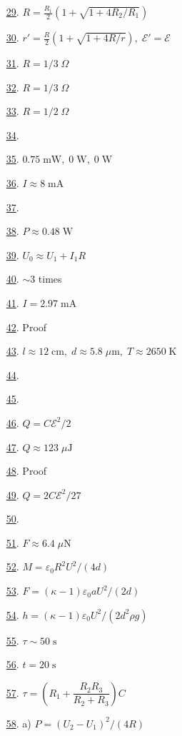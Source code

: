 \documentclass[11pt]{article}
\begin{document}
\begin{multicols}{2}
\begin{enumerate}
	\item [\hyperlink{P29}{29}.] $R=\frac{R_1}{2}\left(1+\sqrt{1+4R_2/R_1}\right)$ %
	\item [\hyperlink{P30}{30}.] $r'=\frac{R}{2}\left(1+\sqrt{1+4R/r}\right),\;\mathcal{E}'=\mathcal{E}$ %
	\item [\hyperlink{P31}{31}.] $R=1/3\;\Omega$ %
	\item [\hyperlink{P32}{32}.] $R=1/3\;\Omega$ %
	\item [\hyperlink{P33}{33}.] $R=1/2\;\Omega$ %
	\item [\hyperlink{P34}{34}.]  %
	\item [\hyperlink{P35}{35}.] $0.75\;\text{mW},\;0\;\text{W},\;0\;\text{W}$ %
	\item [\hyperlink{P36}{36}.] $I\approx8\;\text{mA}$ %
	\item [\hyperlink{P37}{37}.]  %
	\item [\hyperlink{P38}{38}.] $P\approx0.48\;\text{W}$ %
	\item [\hyperlink{P39}{39}.] $U_0\approx U_1+I_1R$ %
	\item [\hyperlink{P40}{40}.] $\sim 3$ times %
	\item [\hyperlink{P41}{41}.] $I=2.97\;\text{mA}$ %
	\item [\hyperlink{P42}{42}.] Proof %
	\item [\hyperlink{P43}{43}.] $l\approx12\;\text{cm},\;d\approx5.8\;\mu\text{m},\;T\approx2650\;\text{K}$ %
	\item [\hyperlink{P44}{44}.]  %
	\item [\hyperlink{P45}{45}.]  %
	\item [\hyperlink{P46}{46}.] $Q=C\mathcal{E}^2/2$ %
	\item [\hyperlink{P47}{47}.] $Q\approx123\;\mu\text{J}$ %
	\item [\hyperlink{P48}{48}.] Proof %
	\item [\hyperlink{P49}{49}.] $Q=2C\mathcal{E}^2/27$ %
	\item [\hyperlink{P50}{50}.]  %
	\item [\hyperlink{P51}{51}.] $F\approx6.4\;\mu\text{N}$ %
	\item [\hyperlink{P52}{52}.] $M=\varepsilon_0R^2U^2/(4d)$ %
	\item [\hyperlink{P53}{53}.] $F=(\kappa-1)\varepsilon_0aU^2/(2d)$ %
	\item [\hyperlink{P54}{54}.] $h=(\kappa-1)\varepsilon_0U^2/(2d^2\rho g)$ %
	\item [\hyperlink{P55}{55}.] $\tau\sim 50\;\text{s}$ %
	\item [\hyperlink{P56}{56}.] $t=20\;\text{s}$ %
	\item [\hyperlink{P57}{57}.] $\tau=\left(R_1+\dfrac{R_2R_3}{R_2+R_3}\right)C$ %
	\item [\hyperlink{P58}{58}.] a) $P=(U_2-U_1)^2/(4R)$
	

\end{enumerate}
\end{multicols}
\end{document}
